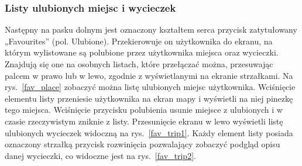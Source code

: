         \subsubsection{Listy ulubionych miejsc i wycieczek}
        Następny na pasku dolnym jest oznaczony kształtem serca przycisk zatytułowany „Favourites” (pol. Ulubione). Przekierowuje on użytkownika do ekranu, na którym wylistowane są polubione przez
        użytkownika miejsca oraz wycieczki. Znajdują się one na osobnych listach, które przełączać można, przesuwając palcem w prawo lub w lewo, zgodnie z wyświetlanymi na ekranie strzałkami.
        Na rys.~\ref{fav_place} zobaczyć można listę ulubionych miejsc użytkownika. Wciśnięcie elementu listy przeniesie użytkownika na ekran mapy i wyświetli na niej pinezkę tego miejsca.
        Wciśnięcie przycisku polubienia usunie miejsce z ulubionych i w czasie rzeczywistym zniknie z listy. Przesunięcie ekranu w lewo wyświetli listę ulubionych wycieczek widoczną na rys.~\ref{fav_trip1}.
        Każdy element listy posiada oznaczony strzałką przycisk rozwinięcia pozwalający zobaczyć podgląd opisu danej wycieczki, co widoczne jest na rys.~\ref{fav_trip2}.
        
